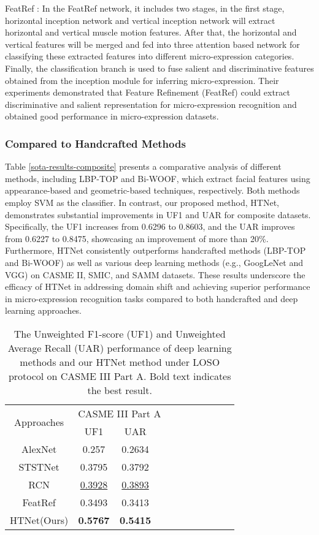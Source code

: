 \documentclass[review,12pt, 3p]{elsarticle}
\begin{document}
FeatRef \cite{ref-15}: In the FeatRef network, it includes two stages, in the first stage, horizontal inception network and vertical inception network will extract horizontal and vertical muscle motion features. After that, the  horizontal  and vertical features will be merged and fed into three attention based network for classifying these extracted features into different micro-expression categories. Finally, the classification branch is used to fuse salient and discriminative features obtained from the inception module for inferring micro-expression. Their experiments demonstrated that Feature Refinement (FeatRef) could extract discriminative and salient representation for micro-expression recognition and obtained good performance in micro-expression datasets. 

\subsubsection{Compared to Handcrafted  Methods}

Table \ref{sota-results-composite} presents a comparative analysis of different methods, including LBP-TOP and Bi-WOOF, which extract facial features using appearance-based and geometric-based techniques, respectively. Both methods employ SVM as the classifier. In contrast, our proposed method, HTNet, demonstrates substantial improvements in UF1 and UAR for composite datasets. Specifically, the UF1 increases from 0.6296 to 0.8603, and the UAR improves from 0.6227 to 0.8475, showcasing an improvement of more than 20\%. Furthermore, HTNet consistently outperforms handcrafted methods (LBP-TOP and Bi-WOOF) as well as various deep learning methods (e.g., GoogLeNet and VGG) on CASME II, SMIC, and SAMM datasets. These results underscore the efficacy of HTNet in addressing domain shift and achieving superior performance in micro-expression recognition tasks compared to both handcrafted and deep learning approaches.
\begin{table}[!t]
\centering
\small
\caption{ The Unweighted F1-score (UF1) and Unweighted Average Recall (UAR) performance of deep learning methods and our HTNet method under LOSO protocol on CASME III Part A. Bold text indicates the best result.}
\begin{tabular}{c c c c c c c c c c c   }
\hline
 \multirow{2}{*}{Approaches} &\multicolumn{3}{c}{CASME III Part A}\\
\cline{2-3} 
 &UF1 &UAR&  \\
\hline
AlexNet \cite{ref-11}  &0.257 & 0.2634 &  \\
STSTNet  \cite{ref-5}    &0.3795  & 0.3792  &  \\
RCN      \cite{ref-6}   &\underline{0.3928} &\underline{0.3893}& \\
FeatRef  \cite{ref-15}&0.3493 & 0.3413  & \\
HTNet(Ours) &\textbf{0.5767} & \textbf{0.5415}  &  \\
\hline
\end{tabular}
 \label{sota-results-part-A}
\end{table}
\end{document}
